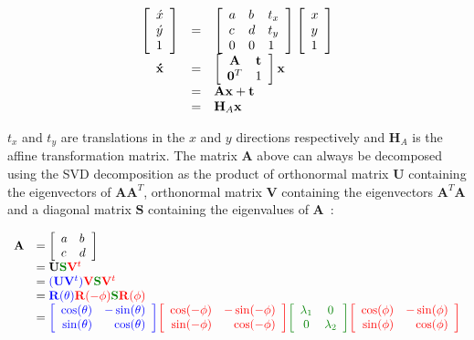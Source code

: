 \begin{equation}
\begin{array}{cllll}
\left[\begin{array}{l}\acute{x}\\\acute{y}\\1\end{array}\right]   &=& \left[ \begin{array}{lll} a &b & t_x \\ c & d & t_y \\ 0 & 0 & 1 \\ \end{array} \right] \left[\begin{array}{l}x\\y\\1\end{array}\right]\\
\mathbf{\acute{x}} &=& \left[\begin{array}{cccc}\mathbf{A} & \mathbf{t}\\\mathbf{0}^T & 1\end{array}\right] \mathbf{x}\\
&=& \mathbf{A}\mathbf{x} + \mathbf{t}\\
&=& \mathbf{H}_A \mathbf{x}\\
\end{array}
\label{Eqn:top_level}
\end{equation}

$t_x$ and $t_y$ are translations in the $x$ and $y$ directions respectively and $\mathbf{H}_A$ is the affine transformation matrix.  The matrix $\mathbf{A}$ above can always be decomposed using the SVD decomposition as the product of orthonormal matrix $\mathbf{U}$ containing the eigenvectors of $\mathbf{A}\mathbf{A}^T$, orthonormal matrix $\mathbf{V}$ containing the eigenvectors  $\mathbf{A}^T\mathbf{A}$ and a diagonal matrix $\mathbf{S}$ containing the eigenvalues of $\mathbf{A}$~\cite{2004_BOOK_CG_Hartley}:

\begin{equation}
\begin{array}{llllllll}
\mathbf{A} &= \left[\begin{array}{lll}a & b \\ c & d\\ \end{array}\right] \\
&=\mathbf{U}{\color{darkgreen}\mathbf{S}}{\color{red}\mathbf{V}^t} \\
&={\color{blue}(\mathbf{U}\mathbf{V}^t)}{\color{red}\mathbf{V}}{\color{darkgreen}\mathbf{S}}{\color{red}\mathbf{V}^t}\\
&={\color{blue}\mathbf{R}(\theta)}{\color{red}\mathbf{R}(-\phi)}{\color{darkgreen}\mathbf{S}}{\color{red}\mathbf{R} (\phi)}\\
&={\color{blue}\RotMatrixTheta}{\color{red}\RotMatrixminusPhi}{\color{darkgreen}\EigenvalueMatrix}{\color{red}\RotMatrixPhi}\\\\
\end{array}
\label{Eq:AffineDecomposition}
\end{equation}


